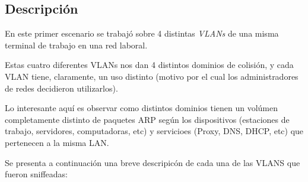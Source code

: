 \subsection{Descripci\'on}
    \par En este primer escenario se trabaj\'o sobre 4 distintas \textit{VLANs}
    de una misma terminal de trabajo en una red laboral.

    \par Estas cuatro diferentes VLANs nos dan 4 distintos dominios de colisi\'on,
    y cada VLAN tiene, claramente, un uso distinto (motivo por el cual los
    administradores de redes decidieron utilizarlos).

    \par Lo interesante aqu\'i es observar como distintos dominios tienen un
    vol\'umen completamente distinto de paquetes ARP seg\'un los dispositivos
    (estaciones de trabajo, servidores, computadoras, etc) y servicioes (Proxy,
    DNS, DHCP, etc) que pertenecen a la misma LAN.

    \par Se presenta a continuaci\'on una breve descripic\'on de cada una de las
    VLANS que fueron sniffeadas:

